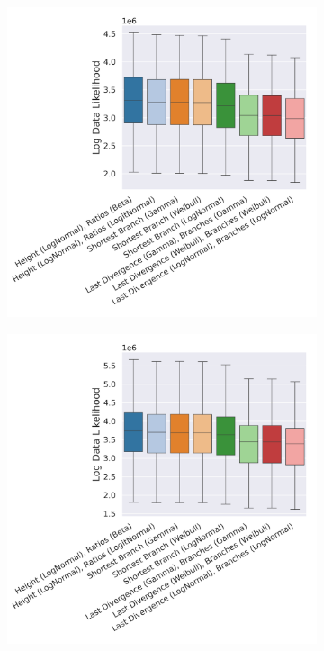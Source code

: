 \documentclass[10pt,letterpaper]{article}
\begin{document}
\begin{figure}
	\caption{The log data likelihoods for the different distributions and datasets. (The higher the better.)}
	
	\centering
	\begin{subfigure}[b]{0.4\textwidth}
		\centering
		\includegraphics[width=\textwidth]{figures/yule-100-ccd1-likelihood.png}
	\end{subfigure}
	\begin{subfigure}[b]{0.4\textwidth}
		\centering
		\includegraphics[width=\textwidth]{figures/yule-200-ccd1-likelihood.png}
	\end{subfigure}
	

\end{figure}
\end{document}
